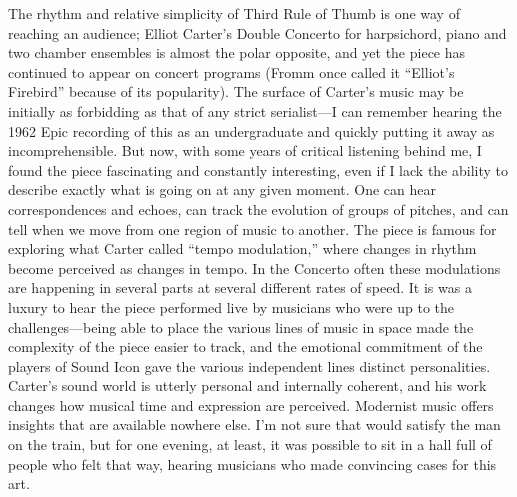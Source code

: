 The rhythm and relative simplicity of Third Rule of Thumb is one way of reaching an audience; Elliot Carter’s Double Concerto for harpsichord, piano and two chamber ensembles is almost the polar opposite, and yet the piece has continued to appear on concert programs (Fromm once called it “Elliot’s Firebird” because of its popularity). The surface of Carter’s music may be initially as forbidding as that of any strict serialist—I can remember hearing the 1962 Epic recording of this as an undergraduate and quickly putting it away as incomprehensible. But now, with some years of critical listening behind me, I found the piece fascinating and constantly interesting, even if I lack the ability to describe exactly what is going on at any given moment. One can hear correspondences and echoes, can track the evolution of groups of pitches, and can tell when we move from one region of music to another. The piece is famous for exploring what Carter called “tempo modulation,” where changes in rhythm become perceived as changes in tempo. In the Concerto often these modulations are happening in several parts at several different rates of speed. It is was a luxury to hear the piece performed live by musicians who were up to the challenges—being able to place the various lines of music in space made the complexity of the piece easier to track, and the emotional commitment of the players of Sound Icon gave the various independent lines distinct personalities. Carter’s sound world is utterly personal and internally coherent, and his work changes how musical time and expression are perceived. Modernist music offers insights that are available nowhere else. I’m not sure that would satisfy the man on the train, but for one evening, at least, it was possible to sit in a hall full of people who felt that way, hearing musicians who made convincing cases for this art.
